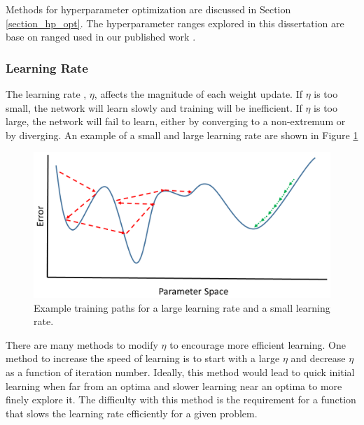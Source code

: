 Methods for hyperparameter optimization are discussed in Section \ref{section_hp_opt}. The hyperparameter ranges explored in this dissertation are base on ranged used in our published work \cite{kamuda2017, kamuda2018, kamudaThesis2017}.

\subsubsection{Learning Rate} \label{LearningRateSubsection}

The learning rate , $\eta$, affects the magnitude of each weight update. If $\eta$ is too small, the network will learn slowly and training will be inefficient. If $\eta$ is too large, the network will fail to learn, either by converging to a non-extremum or by diverging. An example of a small and large learning rate are shown in Figure \ref{fig:Learning_rate_comparison} 

\begin{figure}[H]
	\centering
	\includegraphics[width=0.8\linewidth]{images/Learning_rate_comparison_v2}
	\caption{Example training paths for a large learning rate and a small learning rate.}
	\label{fig:Learning_rate_comparison}
\end{figure}


There are many methods to modify $\eta$ to encourage more efficient learning. One method to increase the speed of learning is to start with a large $\eta$ and decrease $\eta$ as a function of iteration number. Ideally, this method would lead to quick initial learning when far from an optima and slower learning near an optima to more finely explore it. The difficulty with this method is the requirement for a function that slows the learning rate efficiently for a given problem.

